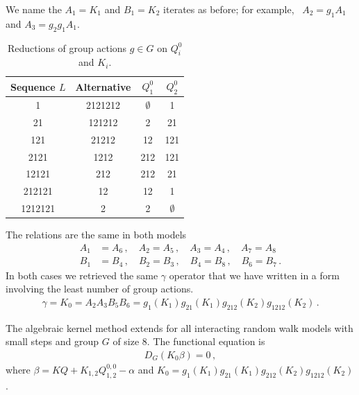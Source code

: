 We name the $A_1 = K_1$ and $B_1 = K_2$ iterates as before; for example, \ $A_2 = g_1 A_1$ and $A_3 = g_2 g_1 A_1$.
\begin{table}[H]
\caption{Reductions of group actions $g \in G$ on $Q_i^0$ and $K_i$.}
\label{tbl:tableG6}
\centering
\begin{tabular}{cccc}
\toprule
	Sequence $L$ & Alternative & $Q_1^0$ & $Q_2^0$ \\ 
\midrule
	1 & 2121212 & $\emptyset$ & 1 \\
	21 &  121212& 2 & 21   \\
	121 & 21212 & 12 & 121  \\
	2121 & 1212 &  212 & 121  \\
	12121 & 212 &  212 & 21  \\
	212121 & 12 &  12& 1  \\
	1212121 & 2 &  2& $\emptyset$ \\
\bottomrule
\end{tabular}
\end{table}
The relations are the same in both models
\begin{align}
	A_1 &= A_6\,,\quad A_2 = A_5\,,\quad A_3 = A_4\,,\quad A_7 = A_8\,\\
	B_1 &= B_4\,, \quad B_2 = B_3\,,\quad B_4 = B_8\,,\quad B_6 = B_7\,.
\end{align}
In both cases we retrieved the same $\gamma$ operator that we have written in a form involving the least number of group actions.
\begin{align}
	\gamma = K_0 =  A_2 A_3 B_5 B_6 = g_1(K_1) g_{21}(K_1) g_{212}(K_2) g_{1212}(K_2)\,.
\end{align}
\begin{theorem} The algebraic kernel method extends for all interacting random walk models with small steps and group $G$ of size 8. The functional equation is
\begin{align}
	D_G(K_0 \beta) = 0\,,
\end{align}
where $\beta =  KQ + K_{1,2}Q_{1,2}^{0,0} -\alpha$ and $K_0 = g_1(K_1) g_{21}(K_1) g_{212}(K_2) g_{1212}(K_2)$.
\end{theorem}

\endinput